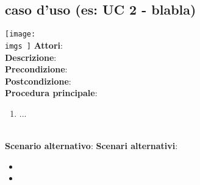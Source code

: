 \subsection{caso d'uso (es: UC 2 - blabla)}{
	\label{uc1.2} %
	 \texttt{[image: \\imgs ]} %
	\textbf{Attori}: %
	\\ %
	\textbf{Descrizione}: %
	\\
	\textbf{Precondizione}: %
	\\
	\textbf{Postcondizione}: %
	\\
	\textbf{Procedura principale}: %
		\begin{enumerate}
			\item ...
		\end{enumerate}
	
	\\
	\textbf{Scenario alternativo}: %
	\textbf{Scenari alternativi}: %
	\begin{itemize}
		\item %
		\item %
	\end{itemize}
	}
	